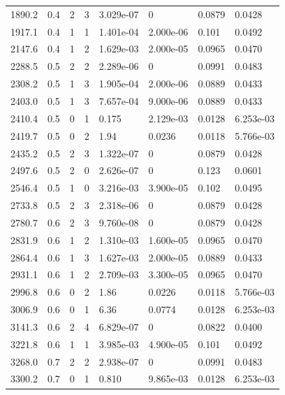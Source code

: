 \documentclass[preview]{standalone}
\begin{document}
{{{\begin{tabular}{L{1.2cm}C{1.2cm} C{0.3cm}C{0.5cm} C{1.4cm}C{1.4cm} C{1.4cm}C{1.4cm}}
  1890.2  &   0.4  & 2     &  3 &  3.029e-07  & 0  & 0.0879 &  0.0428   \\ 
  1917.1  &   0.4  & 1     &  1 &  1.401e-04  & 2.000e-06  & 0.101 &  0.0492   \\ 
  2147.6  &   0.4  & 1     &  2 &  1.629e-03  & 2.000e-05  & 0.0965 &  0.0470   \\ 
  2288.5  &   0.5  & 2     &  2 &  2.289e-06  & 0  & 0.0991 &  0.0483   \\ 
  2308.2  &   0.5  & 1     &  3 &  1.905e-04  & 2.000e-06  & 0.0889 &  0.0433   \\ 
  2403.0  &   0.5  & 1     &  3 &  7.657e-04  & 9.000e-06  & 0.0889 &  0.0433   \\ 
  2410.4  &   0.5  & 0     &  1 &  0.175  & 2.129e-03  & 0.0128 &  6.253e-03   \\ 
  2419.7  &   0.5  & 0     &  2 &  1.94  & 0.0236  & 0.0118 &  5.766e-03   \\ 
  2435.2  &   0.5  & 2     &  3 &  1.322e-07  & 0  & 0.0879 &  0.0428   \\ 
  2497.6  &   0.5  & 2     &  0 &  2.626e-07  & 0  & 0.123 &  0.0601   \\ 
  2546.4  &   0.5  & 1     &  0 &  3.216e-03  & 3.900e-05  & 0.102 &  0.0495   \\ 
  2733.8  &   0.5  & 2     &  3 &  2.318e-06  & 0  & 0.0879 &  0.0428   \\ 
  2780.7  &   0.6  & 2     &  3 &  9.760e-08  & 0  & 0.0879 &  0.0428   \\ 
  2831.9  &   0.6  & 1     &  2 &  1.310e-03  & 1.600e-05  & 0.0965 &  0.0470   \\ 
  2864.4  &   0.6  & 1     &  3 &  1.627e-03  & 2.000e-05  & 0.0889 &  0.0433   \\ 
  2931.1  &   0.6  & 1     &  2 &  2.709e-03  & 3.300e-05  & 0.0965 &  0.0470   \\ 
  2996.8  &   0.6  & 0     &  2 &  1.86  & 0.0226  & 0.0118 &  5.766e-03   \\ 
  3006.9  &   0.6  & 0     &  1 &  6.36  & 0.0774  & 0.0128 &  6.253e-03   \\ 
  3141.3  &   0.6  & 2     &  4 &  6.829e-07  & 0  & 0.0822 &  0.0400   \\ 
  3221.8  &   0.6  & 1     &  1 &  3.985e-03  & 4.900e-05  & 0.101 &  0.0492   \\ 
  3268.0  &   0.7  & 2     &  2 &  2.938e-07  & 0  & 0.0991 &  0.0483   \\ 
  3300.2  &   0.7  & 0     &  1 &  0.810  & 9.865e-03  & 0.0128 &  6.253e-03   \\ 

\end{tabular}}}}
\end{document}
